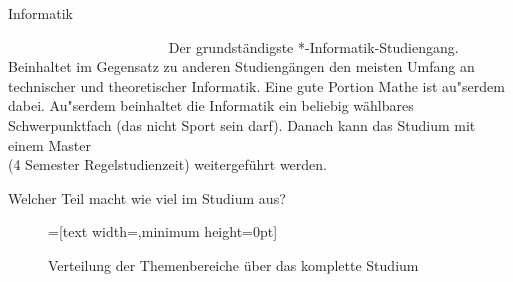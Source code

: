 
\begin{Huge}
    Informatik
\end{Huge}
\begin{exampleblock}{\textcolor{white}{Was ist der Studiengang?}}
    Der grundst\"andigste *-Informatik-Studiengang. Beinhaltet im Gegensatz zu anderen Studieng\"angen den meisten Umfang an technischer und theoretischer Informatik. Eine gute Portion Mathe ist au"serdem dabei. Au"serdem beinhaltet die Informatik ein beliebig w\"ahlbares Schwerpunktfach (das nicht Sport sein darf). Danach kann das Studium mit einem Master \\ (4 Semester Regelstudienzeit) weitergef\"uhrt werden.
\end{exampleblock}	

\begin{block}{Welcher Teil macht wie viel im Studium aus?}
    \begin{figure}[h!]
        \begin{minipage}{\linewidth}
            \centering
            =[text width={},minimum height=0pt]
        \end{minipage}
        
        \caption{Verteilung der Themenbereiche \"uber das komplette Studium}
    \end{figure}	
\end{block}%

